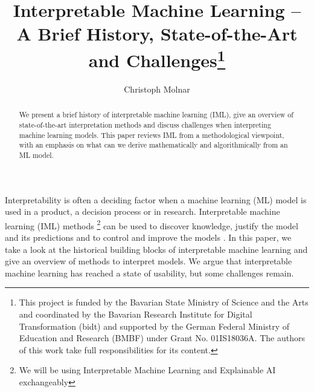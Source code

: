 \documentclass[runningheads]{llncs}
\begin{document}
%
\title{Interpretable Machine Learning -- A Brief History, State-of-the-Art and Challenges\thanks{This project is funded by the Bavarian State Ministry of Science and the Arts and coordinated by the Bavarian Research Institute for Digital Transformation (bidt) and supported by the German Federal Ministry of Education and Research (BMBF) under Grant No. 01IS18036A.
The authors of this work take full responsibilities for its content.
}}
%
%
\author{Christoph Molnar}
%
%
%
\maketitle              %
%
\begin{abstract}
  We present a brief history of interpretable machine learning (IML), give an overview of state-of-the-art interpretation methods and discuss challenges when interpreting machine learning models.
  This paper reviews IML from a methodological viewpoint, with an emphasis on what can we derive mathematically and algorithmically from an ML model.

\end{abstract}
%
%
Interpretability is often a deciding factor when a machine learning (ML) model is used in a product, a decision process or in research.
Interpretable machine learning (IML) methods \footnote{We will be using Interpretable Machine Learning and Explainable AI exchangeably} can be used to discover knowledge, justify the model and its predictions and to control and improve the models \cite{adadi2018peeking}.
In this paper, we take a look at the historical building blocks of interpretable machine learning and give an overview of methods to interpret models.
We argue that interpretable machine learning has reached a state of usability, but some challenges remain.
\end{document}
